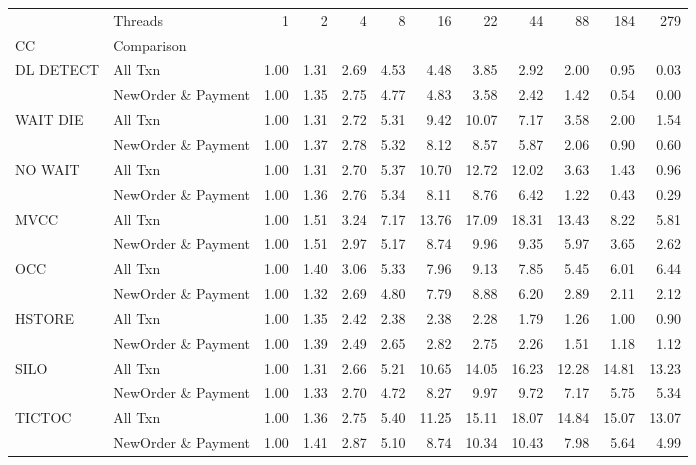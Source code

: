 \begin{tabular}{llrrrrrrrrrr}
\toprule
       & Threads &  1   &  2   &  4   &  8   &   16  &   22  &   44  &   88  &   184 &   279 \\
CC & Comparison &      &      &      &      &       &       &       &       &       &       \\
\midrule
DL DETECT & All Txn & 1.00 & 1.31 & 2.69 & 4.53 &  4.48 &  3.85 &  2.92 &  2.00 &  0.95 &  0.03 \\
       & NewOrder \& Payment & 1.00 & 1.35 & 2.75 & 4.77 &  4.83 &  3.58 &  2.42 &  1.42 &  0.54 &  0.00 \\
WAIT DIE & All Txn & 1.00 & 1.31 & 2.72 & 5.31 &  9.42 & 10.07 &  7.17 &  3.58 &  2.00 &  1.54 \\
       & NewOrder \& Payment & 1.00 & 1.37 & 2.78 & 5.32 &  8.12 &  8.57 &  5.87 &  2.06 &  0.90 &  0.60 \\
NO WAIT & All Txn & 1.00 & 1.31 & 2.70 & 5.37 & 10.70 & 12.72 & 12.02 &  3.63 &  1.43 &  0.96 \\
       & NewOrder \& Payment & 1.00 & 1.36 & 2.76 & 5.34 &  8.11 &  8.76 &  6.42 &  1.22 &  0.43 &  0.29 \\
MVCC & All Txn & 1.00 & 1.51 & 3.24 & 7.17 & 13.76 & 17.09 & 18.31 & 13.43 &  8.22 &  5.81 \\
       & NewOrder \& Payment & 1.00 & 1.51 & 2.97 & 5.17 &  8.74 &  9.96 &  9.35 &  5.97 &  3.65 &  2.62 \\
OCC & All Txn & 1.00 & 1.40 & 3.06 & 5.33 &  7.96 &  9.13 &  7.85 &  5.45 &  6.01 &  6.44 \\
       & NewOrder \& Payment & 1.00 & 1.32 & 2.69 & 4.80 &  7.79 &  8.88 &  6.20 &  2.89 &  2.11 &  2.12 \\
HSTORE & All Txn & 1.00 & 1.35 & 2.42 & 2.38 &  2.38 &  2.28 &  1.79 &  1.26 &  1.00 &  0.90 \\
       & NewOrder \& Payment & 1.00 & 1.39 & 2.49 & 2.65 &  2.82 &  2.75 &  2.26 &  1.51 &  1.18 &  1.12 \\
SILO & All Txn & 1.00 & 1.31 & 2.66 & 5.21 & 10.65 & 14.05 & 16.23 & 12.28 & 14.81 & 13.23 \\
       & NewOrder \& Payment & 1.00 & 1.33 & 2.70 & 4.72 &  8.27 &  9.97 &  9.72 &  7.17 &  5.75 &  5.34 \\
TICTOC & All Txn & 1.00 & 1.36 & 2.75 & 5.40 & 11.25 & 15.11 & 18.07 & 14.84 & 15.07 & 13.07 \\
       & NewOrder \& Payment & 1.00 & 1.41 & 2.87 & 5.10 &  8.74 & 10.34 & 10.43 &  7.98 &  5.64 &  4.99 \\
\bottomrule
\end{tabular}
